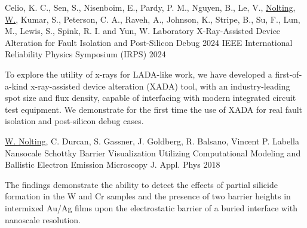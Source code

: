 \begin{cventries}
 \cventrywrite
 {Celio, K. C., Sen, S., Nisenboim, E., Pardy, P. M., Nguyen, B., Le, V., \underline{Nolting, W.}, Kumar, S., Peterson, C. A., Raveh, A., Johnson, K., Stripe, B., Su, F., Lun, M., Lewis, S., Spink, R. I. and Yun, W.} %
  {Laboratory X-Ray-Assisted Device Alteration for Fault Isolation and Post-Silicon Debug} %
  {2024 IEEE International Reliability Physics Symposium (IRPS)} %
  {2024} %
    {
      \begin{cvitems} %
        \item {To explore the utility of x-rays for LADA-like work, we have developed a first-of-a-kind x-ray-assisted device alteration (XADA) tool, with an industry-leading spot size and flux density, capable of interfacing with modern integrated circuit test equipment. We demonstrate for the first time the use of XADA for real fault isolation and post-silicon debug cases.}
      \end{cvitems}
    }
    \vspace{2.0mm}
\cventrywrite
{\underline{W. Nolting}, C. Durcan, S. Gassner, J. Goldberg, R. Balsano, Vincent P. Labella} %
{Nansocale Schottky Barrier Visualization Utilizing Computational Modeling and Ballistic Electron Emission Microscopy} %
{J. Appl. Phys} %
{2018} %
{
  \begin{cvitems} %
    \item { The findings demonstrate the ability to detect the effects of partial silicide formation in the W and Cr samples and the presence of two barrier heights in intermixed Au/Ag films upon the electrostatic barrier of a buried interface with nanoscale resolution.}
  \end{cvitems}
}


\end{cventries}
